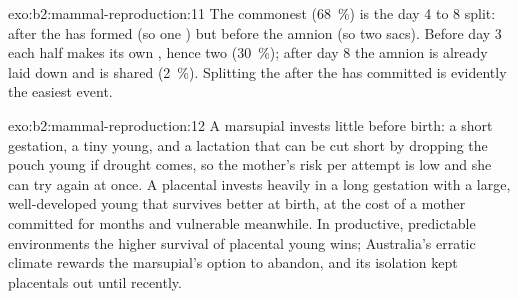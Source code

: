 \begin{solution}{exo:b2:mammal-reproduction:11}
The commonest (\qty{68}{\%}) is the day 4 to 8 split: after the
 has formed (so one ) but before the amnion
(so two sacs). Before day 3 each half makes its own ,
hence two  (\qty{30}{\%}); after day 8 the amnion is
already laid down and is shared (\qty{2}{\%}). Splitting the  after the  has committed is evidently the
easiest event.
\end{solution}

\begin{solution}{exo:b2:mammal-reproduction:12}
A marsupial invests little before birth: a short gestation, a tiny
young, and a lactation that can be cut short by dropping the pouch
young if drought comes, so the mother's risk per attempt is low and
she can try again at once. A placental invests heavily in a long
gestation with a large, well-developed young that survives better
at birth, at the cost of a mother committed for months and
vulnerable meanwhile. In productive, predictable environments the
higher survival of placental young wins; Australia's erratic
climate rewards the marsupial's option to abandon, and its isolation
kept placentals out until recently.
\end{solution}

